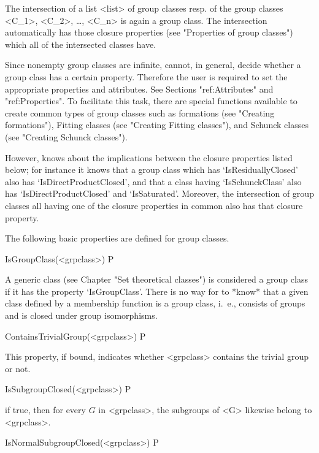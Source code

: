 The intersection of a list <list> of group classes resp. of the group
classes <C_1>, <C_2>, \dots, <C_n> is again
a group class. The intersection automatically has those closure properties
(see "Properties of group classes") which all of the intersected classes
have. 


\null


Since nonempty group classes are infinite, {\CRISP} cannot, in
general, decide whether a group class has a certain property. Therefore the
user is required to set the appropriate properties and attributes. 
See Sections "ref:Attributes" and "ref:Properties". To facilitate this task, 
there are special functions available to
create common types of group classes such as formations (see "Creating
formations"), Fitting classes (see "Creating Fitting classes"), and Schunck
classes (see "Creating Schunck classes").

However, {\CRISP}
knows about the implications between the closure properties listed below; for
instance it knows that a group class which has `IsResiduallyClosed' also has
`IsDirectProductClosed', and that a class having `IsSchunckClass' also has
`IsDirectProductClosed' and `IsSaturated'. Moreover, the intersection of
group classes all having one of the closure properties in common also has
that closure property.

The following
basic properties are defined for group classes.

\>IsGroupClass(<grpclass>) P

A generic class (see Chapter "Set theoretical classes") is considered a group
class if it has the property `IsGroupClass'. There is no way for {\CRISP} to
*know* that a given class defined by a membership function is a group class,
i.~e., consists of groups and is closed under group isomorphisms.

\> ContainsTrivialGroup(<grpclass>) P

This property, if bound, indicates whether <grpclass> contains the trivial group
or not.

\> IsSubgroupClosed(<grpclass>) P

if true, then for every $G$ in <grpclass>, the subgroups of <G> likewise
belong to <grpclass>.

\> IsNormalSubgroupClosed(<grpclass>) P

